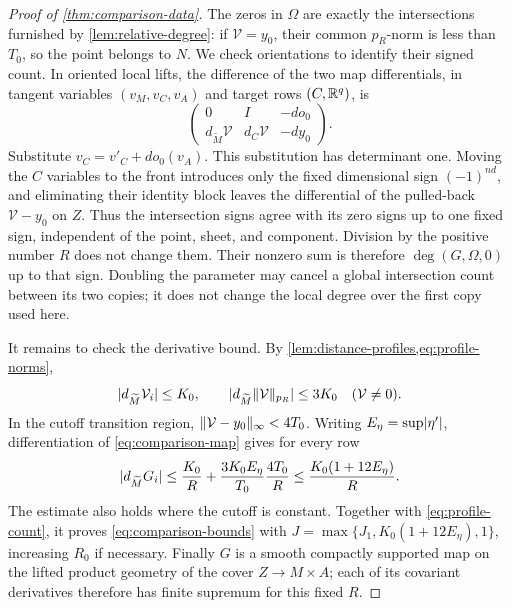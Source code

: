 \begin{proof}[Proof of \cref{thm:comparison-data}]
The zeros in $\Omega$ are exactly the intersections furnished by
\cref{lem:relative-degree}: if $\mathcal V=y_0$, their common
$p_R$-norm is less than $T_0$, so the point belongs to $N$.
We check orientations to identify their signed count.  In oriented
local lifts, the difference of the two map differentials, in tangent
variables $(v_M,v_C,v_A)$ and target rows $(C,\mathbb R^q)$, is
\[
 \begin{pmatrix}
  0&I&-do_0\\
  d_{\widetilde M}\mathcal V&d_C\mathcal V&-dy_0
 \end{pmatrix}.
\]
Substitute $v_C=v'_C+do_0(v_A)$.  This substitution has determinant
one.  Moving the $C$ variables to the front introduces only the fixed
dimensional sign $(-1)^{nd}$, and eliminating their identity block
leaves the differential of the pulled-back $\mathcal V-y_0$ on $Z$.
Thus the intersection signs agree with its zero signs up to one
fixed sign, independent of the point, sheet, and component.  Division
by the positive number $R$ does not change them.  Their nonzero sum
is therefore $\deg(G,\Omega,0)$ up to that sign.  Doubling the parameter
may cancel a global intersection count between its two copies; it
does not change the local degree over the first copy used here.

It remains to check the derivative bound.  By
\cref{lem:distance-profiles,eq:profile-norms},
\[
 \lvert d_{\widetilde M}\mathcal V_i\rvert\le K_0,
 \qquad
 \lvert d_{\widetilde M}\lVert\mathcal V\rVert_{p_R}\rvert\le3K_0
 \quad(\mathcal V\ne0).
\]
In the cutoff transition region,
$\lVert\mathcal V-y_0\rVert_\infty<4T_0$.  Writing
$E_\eta=\sup\lvert\eta'\rvert$, differentiation of
\cref{eq:comparison-map} gives for every row
\[
 \lvert d_{\widetilde M}G_i\rvert
 \le\frac{K_0}{R}
       +\frac{3K_0E_\eta}{T_0}\frac{4T_0}{R}
 \le\frac{K_0(1+12E_\eta)}{R}.
\]
The estimate also holds where the cutoff is constant.  Together with
\cref{eq:profile-count}, it proves \cref{eq:comparison-bounds} with
$J=\max\{J_1,K_0(1+12E_\eta),1\}$, increasing $R_0$ if necessary.
Finally $G$ is a smooth compactly supported map on the lifted product
geometry of the cover $Z\to M\times A$; each of its covariant
derivatives therefore has finite supremum for this fixed $R$.
\end{proof}
